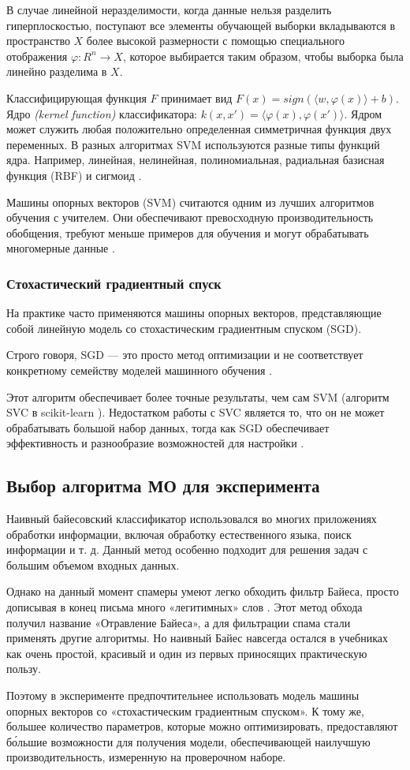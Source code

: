 В случае линейной неразделимости, когда данные нельзя разделить гиперплоскостью, поступают
все элементы обучающей выборки вкладываются в пространство $X$ более высокой размерности с
помощью специального отображения $\varphi : R^n \rightarrow X$, которое выбирается таким образом,
чтобы выборка была линейно разделима в $X$.

Классифицирующая функция $F$ принимает вид $F(x)=sign(\langle w, \varphi (x) \rangle + b)$.
Ядро \emph{(kernel function)} классификатора: $k(x, x') = \langle \varphi (x), \varphi (x') \rangle $.
Ядром может служить любая положительно определенная симметричная функция двух переменных.
В разных алгоритмах SVM используются разные типы функций ядра. Например, линейная, нелинейная,
полиномиальная, радиальная базисная функция (RBF) и сигмоид \cite{SVM}.

Машины опорных векторов (SVM) считаются одним из лучших алгоритмов обучения
с учителем. Они обеспечивают превосходную производительность обобщения, требуют
меньше примеров для обучения и могут обрабатывать многомерные данные \cite{scikitSGD}.

\subsubsection{Стохастический градиентный спуск}\label{SGD}
На практике часто применяются машины опорных векторов, представляющие собой
линейную модель со стохастическим градиентным спуском (SGD).

Строго говоря, SGD — это просто метод оптимизации и не соответствует
конкретному семейству моделей машинного обучения \cite{IEEE}.

Этот алгоритм обеспечивает более точные результаты, чем сам SVM (алгоритм SVC в scikit-learn \cite{SVC}).
Недостатком работы с SVC является то, что он не может обрабатывать большой
набор данных, тогда как SGD обеспечивает эффективность и разнообразие
возможностей для настройки \cite{scikitSGD}.

\subsection{Выбор алгоритма МО для эксперимента}
Наивный байесовский классификатор использовался во многих приложениях обработки
информации, включая обработку естественного языка, поиск информации и т. д.
Данный метод особенно подходит для решения задач с большим объемом входных данных.

Однако на данный момент спамеры умеют легко обходить фильтр Байеса, просто дописывая в
конец письма много «легитимных» слов \cite{filters}. Этот метод обхода получил название «Отравление Байеса»,
а для фильтрации спама стали применять другие алгоритмы. Но наивный Байес навсегда остался
в учебниках как очень простой, красивый и один из первых приносящих практическую пользу.

Поэтому в эксперименте предпочтительнее использовать модель машины опорных векторов
со «стохастическим градиентным спуском». К тому же, большее количество параметров,
которые можно оптимизировать, предоставляют бо́льшие возможности для получения модели,
обеспечивающей наилучшую производительность, измеренную на проверочном наборе.

